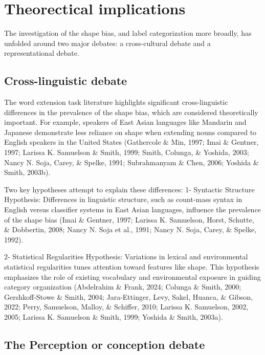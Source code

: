 \documentclass[10pt, letterpaper]{article}
\begin{document}
\hypertarget{theorectical-implications}{%
\section{Theorectical implications}\label{theorectical-implications}}

The investigation of the shape bias, and label categorization more
broadly, has unfolded around two major debates: a cross-cultural debate
and a representational debate.

\hypertarget{cross-linguistic-debate}{%
\subsection{Cross-linguistic debate}\label{cross-linguistic-debate}}

The word extension task literature highlights significant
cross-linguistic differences in the prevalence of the shape bias, which
are considered theoretically important. For example, speakers of East
Asian languages like Mandarin and Japanese demonstrate less reliance on
shape when extending nouns compared to English speakers in the United
States (Gathercole \& Min, 1997; Imai \& Gentner, 1997; Larissa K.
Samuelson \& Smith, 1999; Smith, Colunga, \& Yoshida, 2003; Nancy N.
Soja, Carey, \& Spelke, 1991; Subrahmanyam \& Chen, 2006; Yoshida \&
Smith, 2003b).

Two key hypotheses attempt to explain these differences: 1- Syntactic
Structure Hypothesis: Differences in linguistic structure, such as
count-mass syntax in English versus classifier systems in East Asian
languages, influence the prevalence of the shape bias (Imai \& Gentner,
1997; Larissa K. Samuelson, Horst, Schutte, \& Dobbertin, 2008; Nancy N.
Soja et al., 1991; Nancy N. Soja, Carey, \& Spelke, 1992).

2- Statistical Regularities Hypothesis: Variations in lexical and
environmental statistical regularities tunes attention toward features
like shape. This hypothesis emphasizes the role of existing vocabulary
and environmental exposure in guiding category organization (Abdelrahim
\& Frank, 2024; Colunga \& Smith, 2000; Gershkoff-Stowe \& Smith, 2004;
Jara-Ettinger, Levy, Sakel, Huanca, \& Gibson, 2022; Perry, Samuelson,
Malloy, \& Schiffer, 2010; Larissa K. Samuelson, 2002, 2005; Larissa K.
Samuelson \& Smith, 1999; Yoshida \& Smith, 2003a).

\hypertarget{the-perception-or-conception-debate}{%
\subsection{The Perception or conception
debate}\label{the-perception-or-conception-debate}}
\end{document}

